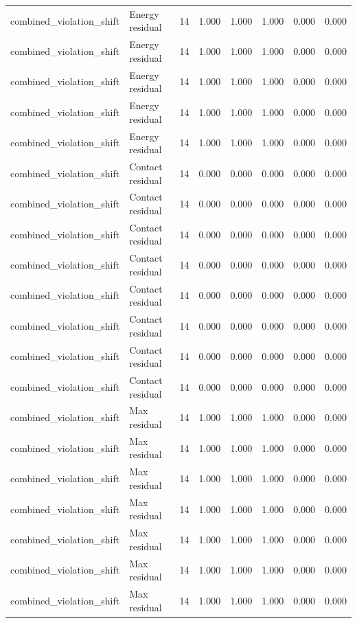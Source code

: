 {\begin{longtable}{llrrrrrr}
combined\_violation\_shift & Energy residual & 14 & 1.000 & 1.000 & 1.000 & 0.000 & 0.000 \\
combined\_violation\_shift & Energy residual & 14 & 1.000 & 1.000 & 1.000 & 0.000 & 0.000 \\
combined\_violation\_shift & Energy residual & 14 & 1.000 & 1.000 & 1.000 & 0.000 & 0.000 \\
combined\_violation\_shift & Energy residual & 14 & 1.000 & 1.000 & 1.000 & 0.000 & 0.000 \\
combined\_violation\_shift & Energy residual & 14 & 1.000 & 1.000 & 1.000 & 0.000 & 0.000 \\
combined\_violation\_shift & Contact residual & 14 & 0.000 & 0.000 & 0.000 & 0.000 & 0.000 \\
combined\_violation\_shift & Contact residual & 14 & 0.000 & 0.000 & 0.000 & 0.000 & 0.000 \\
combined\_violation\_shift & Contact residual & 14 & 0.000 & 0.000 & 0.000 & 0.000 & 0.000 \\
combined\_violation\_shift & Contact residual & 14 & 0.000 & 0.000 & 0.000 & 0.000 & 0.000 \\
combined\_violation\_shift & Contact residual & 14 & 0.000 & 0.000 & 0.000 & 0.000 & 0.000 \\
combined\_violation\_shift & Contact residual & 14 & 0.000 & 0.000 & 0.000 & 0.000 & 0.000 \\
combined\_violation\_shift & Contact residual & 14 & 0.000 & 0.000 & 0.000 & 0.000 & 0.000 \\
combined\_violation\_shift & Contact residual & 14 & 0.000 & 0.000 & 0.000 & 0.000 & 0.000 \\
combined\_violation\_shift & Max residual & 14 & 1.000 & 1.000 & 1.000 & 0.000 & 0.000 \\
combined\_violation\_shift & Max residual & 14 & 1.000 & 1.000 & 1.000 & 0.000 & 0.000 \\
combined\_violation\_shift & Max residual & 14 & 1.000 & 1.000 & 1.000 & 0.000 & 0.000 \\
combined\_violation\_shift & Max residual & 14 & 1.000 & 1.000 & 1.000 & 0.000 & 0.000 \\
combined\_violation\_shift & Max residual & 14 & 1.000 & 1.000 & 1.000 & 0.000 & 0.000 \\
combined\_violation\_shift & Max residual & 14 & 1.000 & 1.000 & 1.000 & 0.000 & 0.000 \\
combined\_violation\_shift & Max residual & 14 & 1.000 & 1.000 & 1.000 & 0.000 & 0.000 \\

\end{longtable}}
